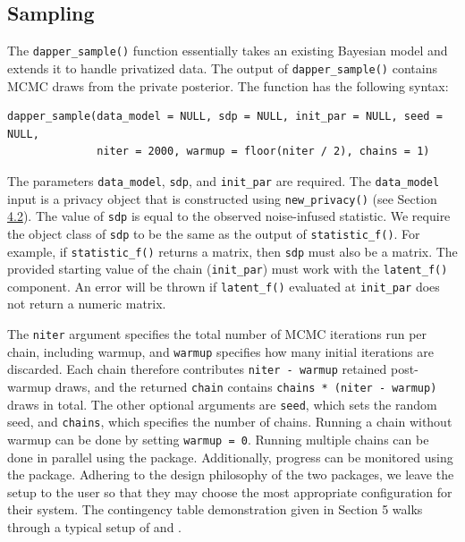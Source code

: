 \subsection{Sampling}\label{sec:sampler}

The \texttt{dapper\_sample()} function essentially takes an existing
Bayesian model and extends it to handle privatized data. The
output of \texttt{dapper\_sample()} contains MCMC draws from
the private posterior. The function has the following syntax:

\begin{verbatim}
dapper_sample(data_model = NULL, sdp = NULL, init_par = NULL, seed = NULL,
              niter = 2000, warmup = floor(niter / 2), chains = 1)
\end{verbatim}

The parameters \texttt{data\_model}, \texttt{sdp}, and \texttt{init\_par} are required.
The \texttt{data\_model} input is a privacy object that is constructed
using \texttt{new\_privacy()} (see Section \hyperref[sec:privacy_model]{4.2}). The value
of \texttt{sdp} is equal to the observed noise-infused statistic. We require the
object class of \texttt{sdp} to be the same as the output of \texttt{statistic\_f()}.
For example, if \texttt{statistic\_f()} returns a matrix,
then \texttt{sdp} must also be a matrix. The provided starting value of the
chain (\texttt{init\_par}) must work with the \texttt{latent\_f()} component. An
error will be thrown if \texttt{latent\_f()} evaluated at \texttt{init\_par} does
not return a numeric matrix.

The \texttt{niter} argument specifies the total number of MCMC iterations run per
chain, including warmup, and \texttt{warmup} specifies how many initial iterations
are discarded. Each chain therefore contributes \texttt{niter\ -\ warmup} retained
post-warmup draws, and the returned \texttt{chain} contains
\texttt{chains\ *\ (niter\ -\ warmup)} draws in total. The other optional arguments are
\texttt{seed}, which sets the random seed, and \texttt{chains}, which specifies the number
of chains. Running a chain without warmup can be done by setting \texttt{warmup\ =\ 0}.
Running multiple chains can be done in parallel
using the  \citep{furrr_pkg} package. Additionally, progress can be monitored
using the  \citep{progressr_pkg} package. Adhering to the design philosophy
of the two packages, we leave the setup to the user so that they may
choose the most appropriate configuration for their system. The
contingency table demonstration given in Section 5 walks
through a typical setup of  and .

